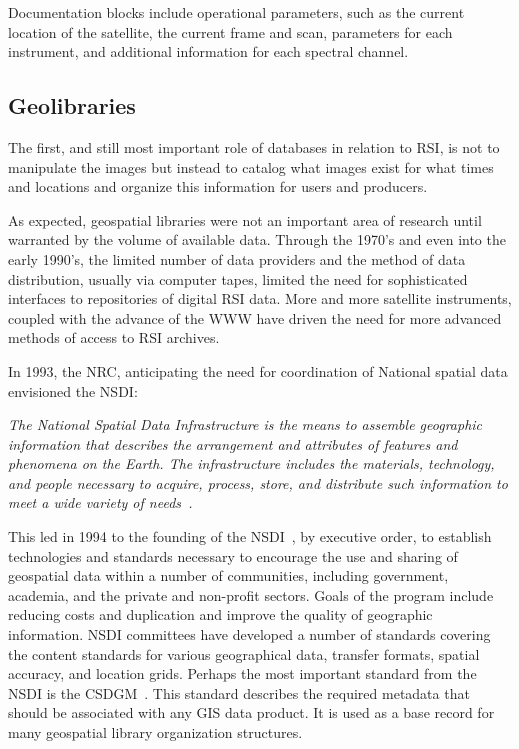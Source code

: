 \documentclass{ucdthesis}       %
\begin{document}
Documentation blocks include operational parameters, such as the
current location of the satellite, the current frame and scan,
parameters for each instrument, and additional information for each
spectral channel.


\subsection{Geolibraries}
\label{sec:geolibraries}

The first, and still most important role of databases in relation to
\ac{RSI}, is not to manipulate the images but instead to catalog what
images exist for what times and locations and organize this
information for users and producers.

As expected, geospatial libraries were not an important area of
research until warranted by the volume of available data.  Through the
1970's and even into the early 1990's, the limited number of data
providers and the method of data distribution, usually via computer
tapes, limited the need for sophisticated interfaces to repositories
of digital \ac{RSI} data.  More and more satellite instruments,
coupled with the advance of the \ac{WWW} have driven the need for more
advanced methods of access to \ac{RSI} archives.

In 1993, the \ac{NRC}, anticipating the need for coordination of
National spatial data envisioned the \acf{NSDI}:

\emph{ The National Spatial Data Infrastructure is the means to
  assemble geographic information that describes the arrangement and
  attributes of features and phenomena on the Earth. The
  infrastructure includes the materials, technology, and people
  necessary to acquire, process, store, and distribute such
  information to meet a wide variety of
  needs~\cite{nrc93towar-coord}.}

This led in 1994 to the founding of the
\acf{NSDI}~\cite{fed12906}, by executive order, to establish
technologies and standards necessary to encourage the use and sharing
of geospatial data within a number of communities, including
government, academia, and the private and non-profit sectors.  Goals
of the program include reducing costs and duplication and improve the
quality of geographic information.  \ac{NSDI} committees have developed a
number of standards covering the content standards for various
geographical data, transfer formats, spatial accuracy, and location
grids.  Perhaps the most important standard from the \ac{NSDI} is the
\acf{CSDGM}~\cite{fgdc98conten-stand}.  This standard describes the
required metadata that should be associated with any \ac{GIS} data
product.  It is used as a base record for many geospatial library
organization structures.
\end{document}
